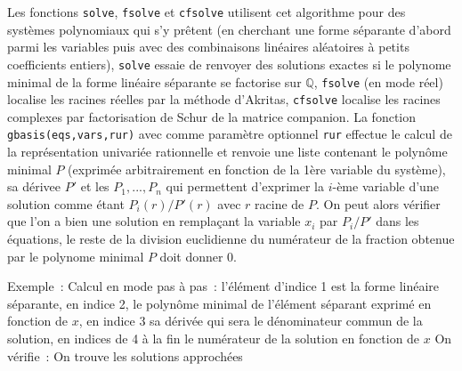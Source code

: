 \documentclass[a4paper,11pt]{book}
\begin{document}
\begin{giacjshere}
Les fonctions \verb|solve|, \verb|fsolve| et \verb|cfsolve| 
utilisent cet algorithme
pour des systèmes polynomiaux qui s'y prêtent (en cherchant une
forme séparante d'abord parmi les variables puis avec des combinaisons
linéaires aléatoires à petits coefficients entiers),
\verb|solve| essaie de renvoyer des solutions exactes
si le polynome minimal de la forme lin\'eaire s\'eparante
se factorise sur $\mathbb{Q}$, \verb|fsolve| (en mode r\'eel)
localise les racines r\'eelles par la m\'ethode d'Akritas,
\verb|cfsolve| localise les racines complexes par
factorisation de Schur de la matrice companion. La fonction
\verb|gbasis(eqs,vars,rur)| avec comme paramètre optionnel \verb|rur|
effectue le calcul de la repr\'esentation univari\'ee rationnelle
et renvoie une liste contenant le polynôme minimal $P$
(exprimée arbitrairement en fonction de la 1ère variable du système),
sa dérivee $P'$ et les $P_1,...,P_n$ qui permettent d'exprimer
la $i$-ème variable d'une solution comme étant $P_i(r)/P'(r)$
avec $r$ racine de $P$. On peut alors
vérifier que l'on a bien une solution en remplaçant la variable
$x_i$ par $P_i/P'$ dans les équations, le reste de la division
euclidienne du numérateur de la fraction obtenue par le polynome 
minimal $P$ doit donner 0.

Exemple~:
Calcul en mode pas \`a pas~:
l'\'el\'ement d'indice 1 est la forme lin\'eaire s\'eparante,
en indice 2, le polyn\^ome minimal de l'\'el\'ement s\'eparant
exprim\'e en fonction de $x$, en indice 3 sa d\'eriv\'ee qui
sera le d\'enominateur commun de la solution, en indices
de 4 \`a la fin le num\'erateur de la solution en fonction de $x$
On v\'erifie~:
On trouve les solutions approch\'ees


\end{giacjshere}
\end{document}

